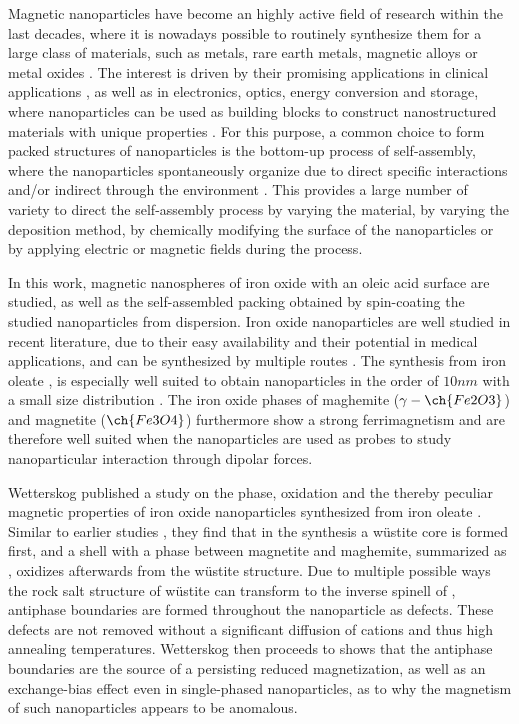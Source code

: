 \documentclass[\main/dresen_thesis.tex]{subfiles}
\begin{document}
  Magnetic nanoparticles have become an highly active field of research within the last decades, where it is nowadays possible to routinely synthesize them for a large class of materials, such as metals, rare earth metals, magnetic alloys or metal oxides \cite{Gubin_2005_Magne}.
  The interest is driven by their promising applications in clinical applications \cite{Thanh_2012_Magne}, as well as in electronics, optics, energy conversion and storage, where nanoparticles can be used as building blocks to construct nanostructured materials with unique properties \cite{Singamaneni_2011_Magne}.
  For this purpose, a common choice to form packed structures of nanoparticles is the bottom-up process of self-assembly, where the nanoparticles spontaneously organize due to direct specific interactions and/or indirect through the environment \cite{Grzelczak_2010_direc, Whitesides_2002_Selfa}.
  This provides a large number of variety to direct the self-assembly process \ie by varying the material, by varying the deposition method, by chemically modifying the surface of the nanoparticles or by applying electric or magnetic fields during the process.

  In this work, magnetic nanospheres of iron oxide with an oleic acid surface are studied, as well as the self-assembled packing obtained by spin-coating the studied nanoparticles from dispersion.
  Iron oxide nanoparticles are well studied in recent literature, due to their easy availability and their potential in medical applications, and can be synthesized by multiple routes \cite{Laurent_2008_Magne}.
  The synthesis from iron oleate \cite{Hyeon_2003_Chemi}, is especially well suited to obtain nanoparticles in the order of $10 \unit{nm}$ with a small size distribution \cite{Wetterskog_2014_Preci}.
  The iron oxide phases of maghemite ($\gamma-\ch{Fe2O3}$) and magnetite ($\ch{Fe3O4}$) furthermore show a strong ferrimagnetism and are therefore well suited when the nanoparticles are used as probes to study nanoparticular interaction through dipolar forces.

  Wetterskog \etal published a study on the phase, oxidation and the thereby peculiar magnetic properties of iron oxide nanoparticles synthesized from iron oleate \cite{Wetterskog_2013_Anoma}.
  Similar to earlier studies \cite{Hai_2010_Sizec, Chen_2010_Chara}, they find that in the synthesis a w\"ustite core is formed first, and a shell with a phase between magnetite and maghemite, summarized as , oxidizes afterwards from the w\"ustite structure.
  Due to multiple possible ways the rock salt structure of w\"ustite can transform to the inverse spinell of , antiphase boundaries are formed throughout the nanoparticle as defects.
  These defects are not removed without a significant diffusion of cations \cite{Margulies_1997_Origi} and thus high annealing temperatures.
  Wetterskog \etal then proceeds to shows that the antiphase boundaries are the source of a persisting reduced magnetization, as well as an exchange-bias effect even in single-phased nanoparticles, as to why the magnetism of such nanoparticles appears to be anomalous.
  \\
\end{document}
